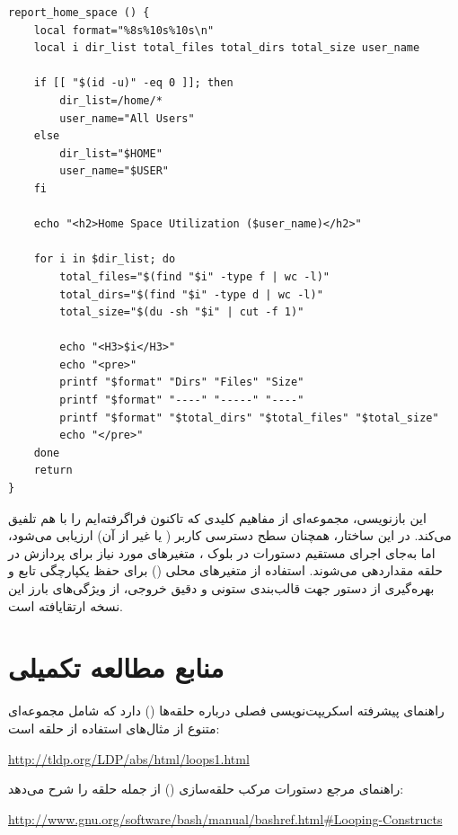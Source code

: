 \begin{latin}
\begin{lstlisting}
report_home_space () {
    local format="%8s%10s%10s\n"
    local i dir_list total_files total_dirs total_size user_name

    if [[ "$(id -u)" -eq 0 ]]; then
        dir_list=/home/*
        user_name="All Users"
    else
        dir_list="$HOME"
        user_name="$USER"
    fi

    echo "<h2>Home Space Utilization ($user_name)</h2>"

    for i in $dir_list; do
        total_files="$(find "$i" -type f | wc -l)"
        total_dirs="$(find "$i" -type d | wc -l)"
        total_size="$(du -sh "$i" | cut -f 1)"

        echo "<H3>$i</H3>"
        echo "<pre>"
        printf "$format" "Dirs" "Files" "Size"
        printf "$format" "----" "-----" "----"
        printf "$format" "$total_dirs" "$total_files" "$total_size"
        echo "</pre>"
    done
    return
}
\end{lstlisting}
\end{latin}

این بازنویسی، مجموعه‌ای از مفاهیم کلیدی که تاکنون فراگرفته‌ایم را با هم تلفیق می‌کند. در این ساختار، همچنان سطح دسترسی کاربر ( یا غیر از آن) ارزیابی می‌شود، اما به‌جای اجرای مستقیم دستورات در بلوک ، متغیرهای مورد نیاز برای پردازش در حلقه  مقداردهی می‌شوند. استفاده از متغیرهای محلی () برای حفظ یکپارچگی تابع و بهره‌گیری از دستور  جهت قالب‌بندی ستونی و دقیق خروجی، از ویژگی‌های بارز این نسخه ارتقایافته است.

\section{منابع مطالعه تکمیلی}

راهنمای پیشرفته اسکریپت‌نویسی  فصلی درباره حلقه‌ها () دارد که شامل مجموعه‌ای متنوع از مثال‌های استفاده از حلقه  است:

\begin{latin}
\url{http://tldp.org/LDP/abs/html/loops1.html}
\end{latin}

راهنمای مرجع  دستورات مرکب حلقه‌سازی () از جمله حلقه  را شرح می‌دهد:

\begin{latin}
\url{http://www.gnu.org/software/bash/manual/bashref.html#Looping-Constructs}
\end{latin}